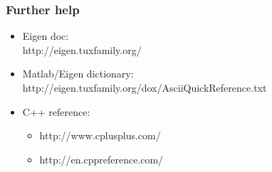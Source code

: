\documentclass{beamer}
\begin{document}
\begin{frame}[fragile]
 \frametitle{Further help}
 \begin{itemize}
  \item Eigen doc: \\
  http://eigen.tuxfamily.org/
  \item Matlab/Eigen dictionary: \\
  http://eigen.tuxfamily.org/dox/AsciiQuickReference.txt
  \item C++ reference:
  \begin{itemize}
   \item http://www.cplusplus.com/
   \item http://en.cppreference.com/
  \end{itemize}
 \end{itemize}
\end{frame}
\end{document}
